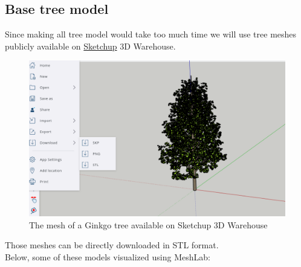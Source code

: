 \documentclass[12pt]{article}
\begin{document}
\subsection{Base tree model}
Since making all tree model would take too much time we will use tree meshes
publicly available on \href{https://app.sketchup.com/app}{Sketchup} 3D Warehouse.

\begin{figure}[H]
    \centering
        \centering
        \includegraphics[width=\textwidth]{images/ginkgo_sketchup.png}
        \caption{The mesh of a Ginkgo tree available on Sketchup 3D Warehouse}
\end{figure}

Those meshes can be directly downloaded in STL format\cite{stl_format}.  \\
Below, some of these models visualized using MeshLab\cite{meshlab}:
\end{document}
